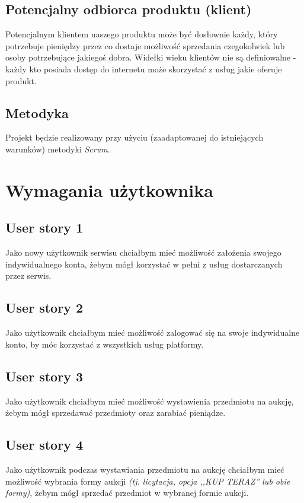 \documentclass[a4paper]{article}
\begin{document}
	\subsection{Potencjalny odbiorca produktu (klient)}
	
	Potencjalnym klientem naszego produktu może być dosłownie każdy, który potrzebuje pieniędzy przez co dostaje możliwość sprzedania czegokolwiek lub osoby potrzebujące jakiegoś dobra. Widełki wieku klientów nie są definiowalne - każdy kto posiada dostęp do internetu może skorzystać z usług jakie oferuje produkt.
	
	\subsection{Metodyka}
	
	Projekt będzie realizowany przy użyciu (zaadaptowanej do istniejących warunków) metodyki {\em Scrum}. 
	
	\section{Wymagania użytkownika}
	
	\subsection{User story 1}
	Jako nowy użytkownik serwisu chciałbym mieć możliwość założenia swojego indywidualnego konta, żebym mógł korzystać w pełni z usług dostarczanych przez serwis.
	
	\subsection{User story 2}
	Jako użytkownik chciałbym mieć możliwość zalogować się na swoje indywidualne konto, by móc korzystać z wszystkich usług platformy.
	
	\subsection{User story 3}
	Jako użytkownik chciałbym mieć możliwość wystawienia przedmiotu na aukcję, żebym mógł sprzedawać przedmioty oraz zarabiać pieniądze.
	
	\subsection{User story 4}
	Jako użytkownik podczas wystawiania przedmiotu na aukcję chciałbym mieć możliwość wybrania formy aukcji \emph{(tj. licytacja, opcja ,,KUP TERAZ'' lub obie formy)}, żebym mógł sprzedać przedmiot w wybranej formie aukcji.
	
\end{document}
